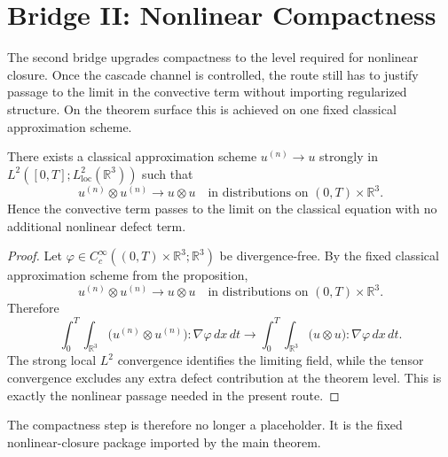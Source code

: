 \section{Bridge II: Nonlinear Compactness}

The second bridge upgrades compactness to the level required for nonlinear closure. Once the cascade channel is controlled, the route still has to justify passage to the limit in the convective term without importing regularized structure. On the theorem surface this is achieved on one fixed classical approximation scheme.

\begin{proposition}
\label{prop:compactness}
There exists a classical approximation scheme \(u^{(n)}\to u\) strongly in \(L^2([0,T];L^2_{\mathrm{loc}}(\mathbb{R}^3))\) such that
\[
u^{(n)}\otimes u^{(n)} \to u\otimes u
\quad\text{in distributions on } (0,T)\times\mathbb{R}^3.
\]
Hence the convective term passes to the limit on the classical equation with no additional nonlinear defect term.
\end{proposition}

\begin{proof}
Let \(\varphi\in C_c^\infty((0,T)\times\mathbb{R}^3;\mathbb{R}^3)\) be divergence-free. By the fixed classical approximation scheme from the proposition,
\[
u^{(n)}\otimes u^{(n)} \to u\otimes u
\quad\text{in distributions on } (0,T)\times\mathbb{R}^3.
\]
Therefore
\[
\int_0^T\!\!\int_{\mathbb{R}^3}
\bigl(u^{(n)}\otimes u^{(n)}\bigr):\nabla\varphi\,dx\,dt
\to
\int_0^T\!\!\int_{\mathbb{R}^3}
\bigl(u\otimes u\bigr):\nabla\varphi\,dx\,dt.
\]
The strong local \(L^2\) convergence identifies the limiting field, while the tensor convergence excludes any extra defect contribution at the theorem level. This is exactly the nonlinear passage needed in the present route.
\end{proof}

The compactness step is therefore no longer a placeholder. It is the fixed nonlinear-closure package imported by the main theorem.
